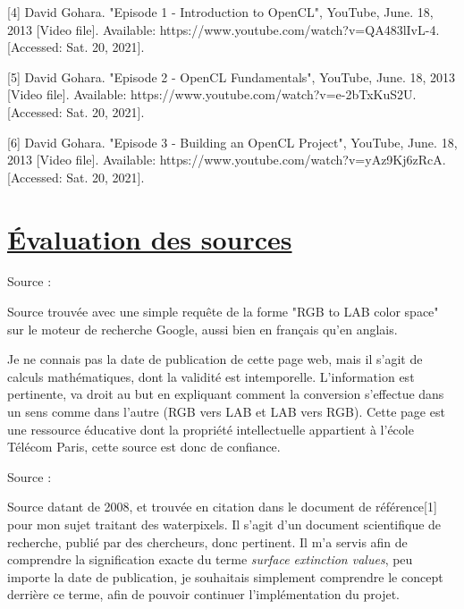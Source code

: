 \documentclass[notitlepage, a4paper, 12pt]{report}
\begin{document}
\begin{flushleft}
\vspace{7mm}

[4] David Gohara. "Episode 1 - Introduction to OpenCL", YouTube, June. 18, 2013 [Video file]. Available: https://www.youtube.com/watch?v=QA483lIvL-4. [Accessed: Sat. 20, 2021].

\vspace{7mm}

[5] David Gohara. "Episode 2 - OpenCL Fundamentals", YouTube, June. 18, 2013 [Video file]. Available: https://www.youtube.com/watch?v=e-2bTxKuS2U. [Accessed: Sat. 20, 2021].

\vspace{7mm}

[6] David Gohara. "Episode 3 - Building an OpenCL Project", YouTube, June. 18, 2013 [Video file]. Available: https://www.youtube.com/watch?v=yAz9Kj6zRcA. [Accessed: Sat. 20, 2021].

\section*{\underline{Évaluation des sources}}

Source  :\newline

Source trouvée avec une simple requête de la forme "RGB to LAB color space" sur le moteur de recherche Google, aussi bien en français qu'en anglais.

Je ne connais pas la date de publication de cette page web, mais il s'agit de calculs mathématiques, dont la validité est intemporelle.
L'information est pertinente, va droit au but en expliquant comment la conversion s'effectue dans un sens comme dans l'autre (RGB vers LAB et LAB vers RGB).
Cette page est une ressource éducative dont la propriété intellectuelle appartient à l'école Télécom Paris, cette source est donc de confiance.
\newline

Source  :\newline

Source datant de 2008, et trouvée en citation dans le document de référence[1] pour mon sujet traitant des waterpixels.
Il s'agit d'un document scientifique de recherche, publié par des chercheurs, donc pertinent.
Il m'a servis afin de comprendre la signification exacte du terme \emph{surface extinction values}, peu importe la date de publication, je souhaitais simplement comprendre le concept derrière ce terme, afin de pouvoir continuer l'implémentation du projet.
\newline


\end{flushleft}
\end{document}
